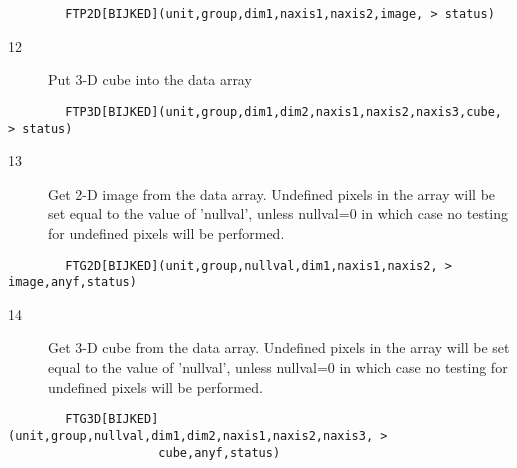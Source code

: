 \documentclass[11pt]{book}
\begin{document}
\begin{verbatim}
        FTP2D[BIJKED](unit,group,dim1,naxis1,naxis2,image, > status)
\end{verbatim}

\begin{description}
\item[12]  Put 3-D cube into the data array
\end{description}

\begin{verbatim}
        FTP3D[BIJKED](unit,group,dim1,dim2,naxis1,naxis2,naxis3,cube, > status)
\end{verbatim}

\begin{description}
\item[13]  Get 2-D image from the data array.  Undefined
     pixels in the array will be set equal to the value of 'nullval',
     unless nullval=0 in which case no testing for undefined pixels will
    be performed.
\end{description}

\begin{verbatim}
        FTG2D[BIJKED](unit,group,nullval,dim1,naxis1,naxis2, > image,anyf,status)
\end{verbatim}

\begin{description}
\item[14] Get 3-D cube from the data array.   Undefined
    pixels in the array will be set equal to the value of 'nullval',
    unless nullval=0 in which case no testing for undefined pixels will
   be performed.
\end{description}

\begin{verbatim}
        FTG3D[BIJKED](unit,group,nullval,dim1,dim2,naxis1,naxis2,naxis3, >
                     cube,anyf,status)
\end{verbatim}
\end{document}
